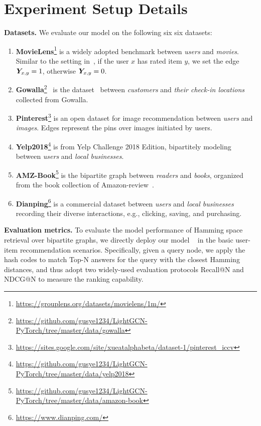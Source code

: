 \section{Experiment Setup Details}
\label{app:exp}
{\textbf{Datasets.}}
We evaluate our model on the following six six datasets:
\begin{enumerate}[leftmargin=*]
\item \textbf{MovieLens}\footnote{\url{https://grouplens.org/datasets/movielens/1m/}} is a widely adopted benchmark between \textit{users} and \textit{movies}. Similar to the setting in~\cite{hashgnn,he2016fast}, if the user $x$ has rated item $y$, we set the edge $\boldsymbol{Y}_{x,y} = 1$, otherwise $\boldsymbol{Y}_{x,y} = 0$. 
\item \textbf{Gowalla}\footnote{\url{https://github.com/gusye1234/LightGCN-PyTorch/tree/master/data/gowalla}}~\cite{ngcf,hashgnn,lightgcn,dgcf} is the dataset~\cite{liang2016modeling} between \textit{customers} and \textit{their check-in locations} collected from Gowalla. 
\item \textbf{Pinterest}\footnote{\url{https://sites.google.com/site/xueatalphabeta/dataset-1/pinterest_iccv}} is an open dataset for image recommendation between \textit{users} and \textit{images}.
Edges represent the pins over images initiated by users. 
\item \textbf{Yelp2018}\footnote{\url{https://github.com/gusye1234/LightGCN-PyTorch/tree/master/data/yelp2018}} is from Yelp Challenge 2018 Edition, bipartitely modeling between \textit{users} and \textit{local businesses}.
\item \textbf{AMZ-Book}\footnote{\url{https://github.com/gusye1234/LightGCN-PyTorch/tree/master/data/amazon-book}} is the bipartite graph between \textit{readers} and \textit{books}, organized from the book collection of Amazon-review~\cite{he2016ups}.  
\item \textbf{Dianping}\footnote{\url{https://www.dianping.com/}} is a commercial dataset between \textit{users} and \textit{local businesses} recording their diverse interactions, e.g., clicking, saving, and purchasing. 
\end{enumerate}

\textbf{Evaluation metrics.}
To evaluate the model performance of Hamming space retrieval over bipartite graphs, we directly deploy our model \model~ in the basic user-item recommendation scenarios.
Specifically, given a query node, we apply the hash codes to match Top-N answers for the query with the closest Hamming distances, and thus adopt two widely-used evaluation protocols Recall@N and NDCG@N to measure the ranking capability.

